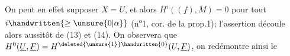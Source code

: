 On peut en effet supposer $X=U$, et alors $H^i((\underline f),M)=0$ pour tout $i\handwritten{\geq\unsure{0|\alpha}}$ (n\textsuperscript{o}1, cor. de la prop.1); l'assertion découle alors aussitôt de (13) et (14). On observera que  $H^0(\underline U,\underline F)=H^{\deleted{\unsure{1}} \handwritten{0}}(U,\underline F)$, on redémontre ainsi le
\endgroup
